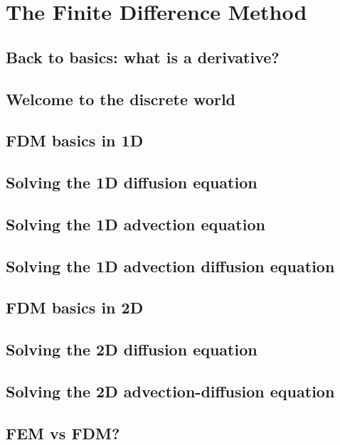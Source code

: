\chapter{The Finite Difference Method} %

\section{Back to basics: what is a derivative?} 
\section{Welcome to the discrete world} 
\section{FDM basics in 1D} \label{ss:fdm_basics1D}  
\section{Solving the 1D diffusion equation} \label{ss:fdm_diff1D} 
\section{Solving the 1D advection equation} \label{ss:fdm_adv1D} 
\newpage
\section{Solving the 1D advection diffusion equation} 
\label{ss:fdm_advdiff1D} 
\newpage
\section{FDM basics in 2D} \label{ss:fdm_basics2D}  
\newpage
\section{Solving the 2D diffusion equation} \label{ss:fdm_diff2D} 
\section{Solving the 2D advection-diffusion equation} \label{ss:fdm_advdiff2D} 

\newpage
\section{FEM vs FDM?}\label{ss:femvsfdm}   
